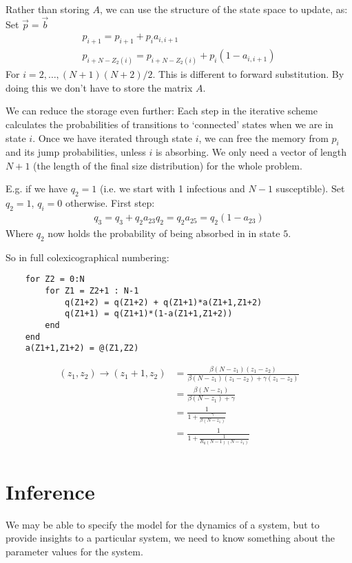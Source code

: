 \documentclass{/home/janmebows/Documents/LatexTemplates/myassignment}
\begin{document}
Rather than storing $A$, we can use the structure of the state space to update, as:
 Set $\vec p = \vec b$
\begin{align*}
    p_{i+1} = p_{i+1} + p_ia_{i,i+1}\\
    p_{i+N - Z_2(i)} = p_{i+N-Z_2(i)} + p_i(1-a_{i,i+1})    
\end{align*}
For $i=2,\hdots,(N+1)(N+2)/2$. This is different to forward substitution. By doing this we don't have to store the matrix $A$.

We can reduce the storage even further:
Each step in the iterative scheme calculates the probabilities of transitions to `connected' states when we are in state $i$.
Once we have iterated through state $i$, we can free the memory from $p_i$ and its jump probabilities, unless $i$ is absorbing.
We only need a vector of length $N+1$ (the length of the final size distribution) for the whole problem.

E.g. if we have $q_2 =1$ (i.e. we start with 1 infectious and $N-1$ susceptible).
Set $q_2 = 1$, $q_i = 0$ otherwise.
First step:
\begin{align*}
    q_3 = q_3 + q_2 a_{23}
    q_2 = q_2a_{25} = q_2(1-a_{23}) 
\end{align*}
Where $q_2$ now holds the probability of being absorbed in in state $5$.

So in full colexicographical numbering: 
\begin{verbatim}
    for Z2 = 0:N
        for Z1 = Z2+1 : N-1
            q(Z1+2) = q(Z1+2) + q(Z1+1)*a(Z1+1,Z1+2)
            q(Z1+1) = q(Z1+1)*(1-a(Z1+1,Z1+2))
        end
    end
    a(Z1+1,Z1+2) = @(Z1,Z2) 
\end{verbatim}
\begin{align*}
    (z_1,z_2) \to (z_1+1, z_2) &= \frac{\beta(N-z_1)(z_1-z_2)}{\beta(N-z_1)(z_1-z_2) + \gamma(z_1-z_2)}\\
    &=\frac{\beta(N-z_1)}{\beta(N-z_1) + \gamma}\\
    &=\frac{1}{1 + \frac{\gamma}{\beta(N-z_1)}}\\
    &=\frac{1}{1 + \frac{1}{R_0(N-1) (N-z_1)}}\\
\end{align*}


\section{Inference}
We may be able to specify the model for the dynamics of a system, but to provide insights to a particular system, we need to know something about the parameter values for the system.
\end{document}

